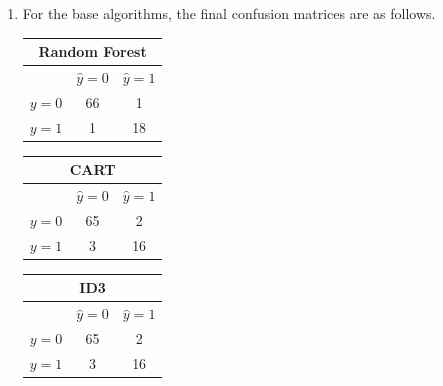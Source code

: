 \documentclass{article}
\begin{document}
\begin{enumerate}
\begin{enumerate}
	\item
	For the base algorithms, the final confusion matrices are as follows.
	\begin{center}
		\begin{tabular}{|c|c|c|}
			\hline
			\multicolumn{3}{|c|}{Random Forest} \\
			\hline
			& $\hat{y}=0$ & $\hat{y}=1$ \\
			\hline
			$y=0$ & 66 & 1 \\
			$y=1$ & 1 & 18 \\
			\hline
		\end{tabular}
                \begin{tabular}{|c|c|c|}
                        \hline
                        \multicolumn{3}{|c|}{CART} \\
                        \hline
                        & $\hat{y}=0$ & $\hat{y}=1$ \\
                        \hline
                        $y=0$ & 65 & 2 \\
                        $y=1$ & 3 & 16 \\
                        \hline
                \end{tabular}
                \begin{tabular}{|c|c|c|}
                        \hline
                        \multicolumn{3}{|c|}{ID3} \\
                        \hline
                        & $\hat{y}=0$ & $\hat{y}=1$ \\
                        \hline
                        $y=0$ & 65 & 2 \\
                        $y=1$ & 3 & 16 \\
                        \hline
                \end{tabular}
        \end{center}


\end{enumerate}
\end{enumerate}
\end{document}
